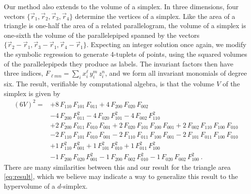 \documentclass[10pt]{article}
\begin{document}
Our method also extends to the volume of a simplex. In three dimensions, four vectors $\{ \vec{r}_1, \vec{r}_2, \vec{r}_3, \vec{r}_4 \}$ determine the vertices of a simplex. 
Like the area of a triangle is one-half the area of a related parallelogram, the volume of a simplex is one-sixth the volume of the parallelepiped spanned by the vectors $\{ \vec{r}_2 - \vec{r}_1, \vec{r}_3 - \vec{r}_1, \vec{r}_4 - \vec{r}_1 \}$. 
Expecting an integer solution once again, we modify the symbolic regression to generate 4-tuplets of points, using the squared volumes of the parallelepipeds they produce as labels.
The invariant factors then have three indices, $F_{\ell m n} = \sum_i x_i^\ell \, y_i^m \, z_i^n$, and we form all invariant monomials of degree six.
The result, verifiable by computational algebra, is that the volume $V$ of the simplex is given by
\begin{align}
(6 V)^2 = &
+8 \, F_{110} \, F_{101} \, F_{011}
+4 \, F_{200} \, F_{020} \, F_{002}
\nonumber \\ &
-4 \, F_{200} \, F_{011}^2
-4 \, F_{020} \, F_{101}^2
-4 \, F_{002} \, F_{110}^2
\nonumber \\ &
+2 \, F_{200} \, F_{011} \, F_{010} \, F_{001}
+2 \, F_{020} \, F_{101} \, F_{100} \, F_{001}
+2 \, F_{002} \, F_{110} \, F_{100} \, F_{010}
\nonumber \\ &
-2 \, F_{110} \, F_{101} \, F_{010} \, F_{001}
-2 \, F_{110} \, F_{011} \, F_{100} \, F_{001}
-2 \, F_{101} \, F_{011} \, F_{100} \, F_{010}
\nonumber \\ &
+1 \, F_{110}^2 \, F_{001}^2
+1 \, F_{101}^2 \, F_{010}^2
+1 \, F_{011}^2 \, F_{100}^2
\nonumber \\ &
-1 \, F_{200} \, F_{020} \, F_{001}^2
-1 \, F_{200} \, F_{002} \, F_{010}^2
-1 \, F_{020} \, F_{002} \, F_{100}^2~.
\label{eq:simplex}
\end{align}
There are many similarities between this and our result for the triangle area \eqref{eq:result}, which we believe may indicate a way to generalize this result to the hypervolume of a $d$-simplex.
\end{document}
